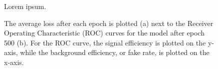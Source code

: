 \begin{figure}[!htb]
  \centering
  \qquad
  \caption{
      Lorem ipsum.
  }
\end{figure}

\begin{figure}[!htb]
  \centering
  \qquad
  \caption{
      The average loss after each epoch is plotted (a) next to the Receiver Operating Characteristic (ROC) curves for the model after epoch 500 (b). 
      For the ROC curve, the signal efficiency is plotted on the y-axis, while the background efficiency, or fake rate, is plotted on the x-axis. 
  }
\end{figure}

